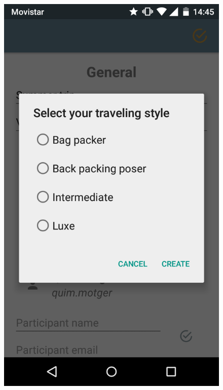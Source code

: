 \begin{itemize}
\begin{figure}[!h]
\includegraphics[scale=0.15]{Figures/style.png}

\end{figure}
\end{itemize}

